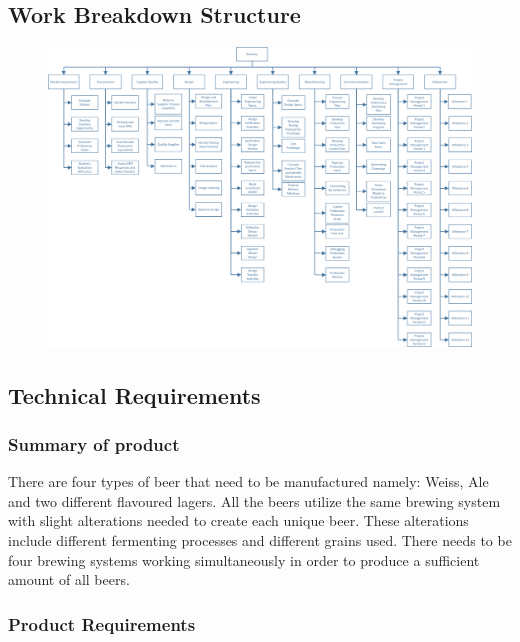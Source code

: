 \begin{landscape}

\subsection{Work Breakdown Structure}

\begin{figure}[H]
\centering
\includegraphics[scale=0.85]{WBS.png}
%
\label{fig:wbs}
\end{figure}

\end{landscape}

\subsection{Technical Requirements}
\subsubsection{Summary of product}

There are four types of beer that need to be manufactured namely: Weiss, Ale and two different flavoured lagers. All the beers utilize the same brewing system with slight alterations needed to create each unique beer. These alterations include different fermenting processes and different grains used. There needs to be four brewing systems working simultaneously in order to produce a sufficient amount of all beers.

\subsubsection{Product Requirements}


